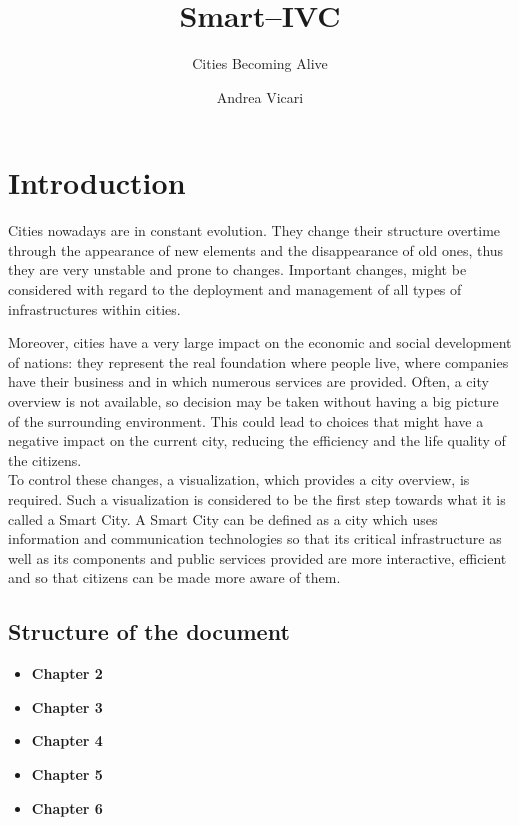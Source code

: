 \documentclass[]{usiinfbachelorproject}
\author{Andrea Vicari}
\title{Smart--IVC}
\subtitle{Cities Becoming Alive}
\begin{document}
\maketitle

\section{Introduction} \label{introduction}
Cities nowadays are in constant evolution. They change their structure overtime through the appearance of new elements and the disappearance of old ones, thus they are very unstable and prone to changes. Important changes, might be considered with regard to the deployment and management of all types of infrastructures within cities.

Moreover, cities have a very large impact on the economic and social development of nations: they represent the real foundation where people live, where companies have their business and in which numerous services are provided. Often, a city overview is not available, so decision may be taken without having a big picture of the surrounding environment. This could lead to choices that might have a negative impact on the current city, reducing the efficiency and the life quality of the citizens.\\

To control these changes, a visualization, which provides a city overview, is required. Such a visualization is considered to be the first step towards what it is called a Smart City. A Smart City can be defined as a city which uses information and communication technologies so that its critical infrastructure as well as its components and public services provided are more interactive, efficient and so that citizens can be made more aware of them.\\
\subsection{Structure of the document}
\begin{itemize}
	\item {\bf Chapter 2}
	\item {\bf Chapter 3}
	\item {\bf Chapter 4}
	\item {\bf Chapter 5}
	\item {\bf Chapter 6}
\end{itemize}

\end{document}

